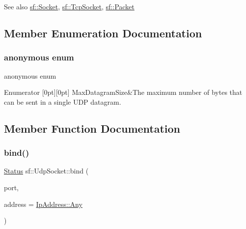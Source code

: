 \begin{DoxySeeAlso}{See also}
\hyperlink{classsf_1_1_socket}{sf\+::\+Socket}, \hyperlink{classsf_1_1_tcp_socket}{sf\+::\+Tcp\+Socket}, \hyperlink{classsf_1_1_packet}{sf\+::\+Packet} 
\end{DoxySeeAlso}


\subsection{Member Enumeration Documentation}
\mbox{\label{classsf_1_1_udp_socket_afff8d18b342f92ba5ec47bb7ba9622ba}} 
\subsubsection{\texorpdfstring{anonymous enum}{anonymous enum}}
{\footnotesize\ttfamily anonymous enum}

\begin{DoxyEnumFields}{Enumerator}
[0pt][0pt]{}\mbox{\label{classsf_1_1_udp_socket_afff8d18b342f92ba5ec47bb7ba9622baa728a7d33027bee0d65f70f964dd9c9eb}} 
Max\+Datagram\+Size&The maximum number of bytes that can be sent in a single U\+DP datagram. \\
\hline

\end{DoxyEnumFields}


\subsection{Member Function Documentation}
\mbox{\label{classsf_1_1_udp_socket_ad764c3d06d90b4714dcc97a0d1647bcc}} 
\subsubsection{\texorpdfstring{bind()}{bind()}}
{\footnotesize\ttfamily \hyperlink{classsf_1_1_socket_a51bf0fd51057b98a10fbb866246176dc}{Status} sf\+::\+Udp\+Socket\+::bind (\begin{DoxyParamCaption}\item[{unsigned short}]{port,  }\item[{const \hyperlink{classsf_1_1_ip_address}{Ip\+Address} \&}]{address = {\ttfamily \hyperlink{classsf_1_1_ip_address_a3dbc10b0dc6804cc69e29342f7406907}{Ip\+Address\+::\+Any}} }\end{DoxyParamCaption})}



